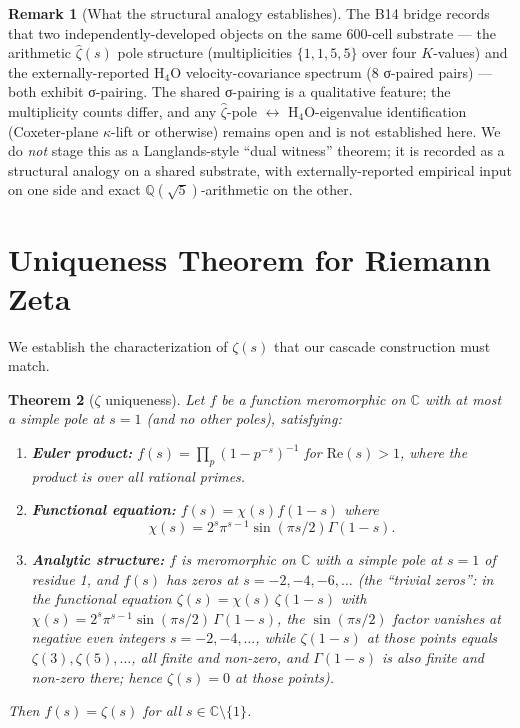 \documentclass[11pt, a4paper]{amsart}
\newtheorem{theorem}{Theorem}[section]
\theoremstyle{definition}
\newtheorem{remark}[theorem]{Remark}
\newcommand{\Q}{\mathbb{Q}}
\newcommand{\C}{\mathbb{C}}
\begin{document}
\begin{remark}[What the structural analogy establishes]
The B14 bridge records that two independently-developed objects on
the same 600-cell substrate — the arithmetic
$\widehat\zeta(s)$ pole structure (multiplicities
$\{1,1,5,5\}$ over four $K$-values) and the externally-reported
H$_4$O velocity-covariance spectrum (8 σ-paired pairs) — both
exhibit σ-pairing.  The shared σ-pairing is a qualitative feature;
the multiplicity counts differ, and any $\widehat\zeta$-pole
$\leftrightarrow$ H$_4$O-eigenvalue identification (Coxeter-plane
$\kappa$-lift or otherwise) remains open and is not established
here.  We do \emph{not} stage this as a Langlands-style ``dual
witness'' theorem; it is recorded as a structural analogy on a
shared substrate, with externally-reported empirical input on one
side and exact $\Q(\sqrt 5)$-arithmetic on the other.
\end{remark}

\section{Uniqueness Theorem for Riemann Zeta}\label{sec:uniqueness}

We establish the characterization of $\zeta(s)$ that our
cascade construction must match.

\begin{theorem}[$\zeta$ uniqueness]\label{thm:unique}
Let $f$ be a function meromorphic on $\C$ with at most a simple
pole at $s=1$ (and no other poles), satisfying:
\begin{enumerate}
\item[(U1)] \textbf{Euler product:} $f(s) = \prod_p (1 - p^{-s})^{-1}$ for
$\mathrm{Re}(s) > 1$, where the product is over all rational primes.
\item[(U2)] \textbf{Functional equation:} $f(s) = \chi(s) f(1-s)$ where
\[
\chi(s) = 2^s \pi^{s-1} \sin(\pi s/2) \Gamma(1-s).
\]
\item[(U3)] \textbf{Analytic structure:} $f$ is meromorphic on $\C$ with
a simple pole at $s=1$ of residue 1, and $f(s)$ has zeros at
$s = -2, -4, -6, \ldots$ (the ``trivial zeros'': in the functional
equation $\zeta(s) = \chi(s)\,\zeta(1-s)$ with
$\chi(s) = 2^s \pi^{s-1} \sin(\pi s/2)\,\Gamma(1-s)$, the
$\sin(\pi s/2)$ factor vanishes at negative even integers
$s = -2, -4, \ldots$, while $\zeta(1-s)$ at those points equals
$\zeta(3), \zeta(5), \ldots$, all finite and non-zero, and
$\Gamma(1-s)$ is also finite and non-zero there; hence
$\zeta(s) = 0$ at those points).
\end{enumerate}

Then $f(s) = \zeta(s)$ for all $s \in \C \setminus \{1\}$.
\end{theorem}
\end{document}
